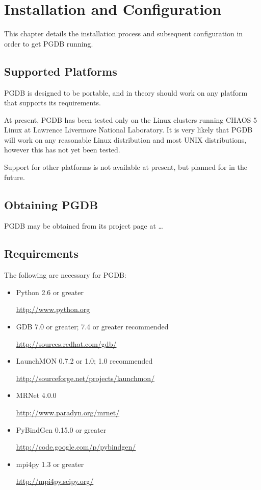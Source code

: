 \documentclass{refart}
\begin{document}
\newpage

\section{Installation and Configuration}

This chapter details the installation process and subsequent configuration in order to get PGDB running.

\subsection{Supported Platforms}

PGDB is designed to be portable, and in theory should work on any platform that supports its requirements.

At present, PGDB has been tested only on the Linux clusters running CHAOS 5 Linux at Lawrence Livermore National Laboratory. It is very likely that PGDB will work on any reasonable Linux distribution and most UNIX distributions, however this has not yet been tested.

Support for other platforms is not available at present, but planned for in the future.

\subsection{Obtaining PGDB}

PGDB may be obtained from its project page at \ldots

\subsection{Requirements}

The following are necessary for PGDB:

\begin{itemize}
\item Python 2.6 or greater

  \url{http://www.python.org}
\item GDB 7.0 or greater; 7.4 or greater recommended

  \url{http://sources.redhat.com/gdb/}
\item LaunchMON 0.7.2 or 1.0; 1.0 recommended

  \url{http://sourceforge.net/projects/launchmon/}
\item MRNet 4.0.0

  \url{http://www.paradyn.org/mrnet/}
\item PyBindGen 0.15.0 or greater

  \url{http://code.google.com/p/pybindgen/}
\item mpi4py 1.3 or greater

  \url{http://mpi4py.scipy.org/}
\end{itemize}
\end{document}
